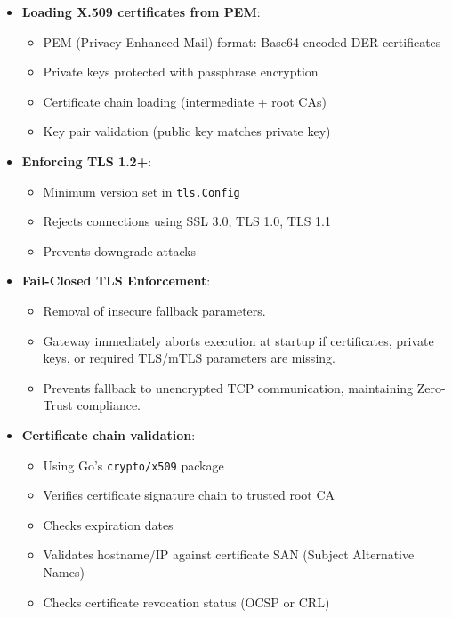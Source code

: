\begin{itemize}
    \item \textbf{Loading X.509 certificates from PEM}:
    \begin{itemize}
        \item PEM (Privacy Enhanced Mail) format: Base64-encoded DER certificates
        \item Private keys protected with passphrase encryption
        \item Certificate chain loading (intermediate + root CAs)
        \item Key pair validation (public key matches private key)
    \end{itemize}
    
    \item \textbf{Enforcing TLS 1.2+}:
    \begin{itemize}
        \item Minimum version set in \texttt{tls.Config}
        \item Rejects connections using SSL 3.0, TLS 1.0, TLS 1.1
        \item Prevents downgrade attacks
    \end{itemize}

    \item \textbf{Fail-Closed TLS Enforcement}:
    \begin{itemize}
        \item Removal of insecure fallback parameters.
        \item Gateway immediately aborts execution at startup if certificates, private keys, or required TLS/mTLS parameters are missing.
        \item Prevents fallback to unencrypted TCP communication, maintaining Zero-Trust compliance.
    \end{itemize}
    
    \item \textbf{Certificate chain validation}:
    \begin{itemize}
        \item Using Go's \texttt{crypto/x509} package
        \item Verifies certificate signature chain to trusted root CA
        \item Checks expiration dates
        \item Validates hostname/IP against certificate SAN (Subject Alternative Names)
        \item Checks certificate revocation status (OCSP or CRL)
    \end{itemize}
    

\end{itemize}

